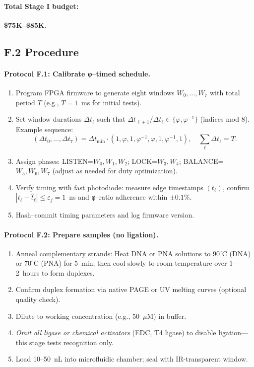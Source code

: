 \documentclass[11pt]{article}
\begin{document}
\paragraph{Total Stage I budget:} \textbf{\$75K–\$85K}.

\subsection*{F.2 Procedure}

\paragraph{Protocol F.1: Calibrate φ–timed schedule.}
\begin{enumerate}
\item Program FPGA firmware to generate eight windows $W_0,\dots,W_7$ with total period $T$ (e.g., $T=1$~ms for initial tests).
\item Set window durations $\Delta t_\ell$ such that $\Delta t_{\ell+1}/\Delta t_\ell\in\{\varphi,\varphi^{-1}\}$ (indices mod 8). Example sequence:
\[
(\Delta t_0,\dots,\Delta t_7)=\Delta t_{\min}\cdot(1,\varphi,1,\varphi^{-1},\varphi,1,\varphi^{-1},1),\quad \sum_\ell \Delta t_\ell=T.
\]
\item Assign phases: \textsf{LISTEN}=$W_0,W_1,W_2$; \textsf{LOCK}=$W_3,W_4$; \textsf{BALANCE}=$W_5,W_6,W_7$ (adjust as needed for duty optimization).
\item Verify timing with fast photodiode: measure edge timestamps $(t_\ell)$, confirm $|t_\ell-\hat t_\ell|\le \varepsilon_j=1$~ns and φ–ratio adherence within $\pm 0.1\%$.
\item Hash–commit timing parameters and log firmware version.
\end{enumerate}

\paragraph{Protocol F.2: Prepare samples (no ligation).}
\begin{enumerate}
\item Anneal complementary strands: Heat DNA or PNA solutions to $90^\circ$C (DNA) or $70^\circ$C (PNA) for 5~min, then cool slowly to room temperature over 1–2~hours to form duplexes.
\item Confirm duplex formation via native PAGE or UV melting curves (optional quality check).
\item Dilute to working concentration (e.g., 50~$\mu$M) in buffer.
\item \emph{Omit all ligase or chemical activators} (EDC, T4 ligase) to disable ligation—this stage tests recognition only.
\item Load 10–50~nL into microfluidic chamber; seal with IR-transparent window.
\end{enumerate}
\end{document}

